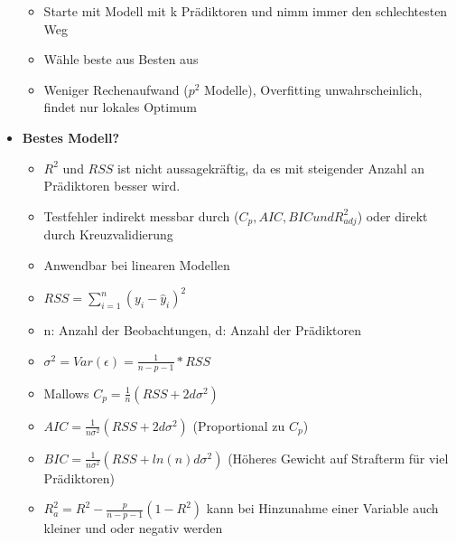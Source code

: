 \documentclass[a4paper]{article}
\begin{document}
\begin{landscape}
\begin{multicols}{3}
\begin{itemize}[noitemsep,nolistsep,leftmargin=*]
\begin{itemize}[noitemsep,nolistsep,leftmargin=*]
                \item Starte mit Modell mit k Prädiktoren und nimm immer den schlechtesten Weg
                \item Wähle beste aus Besten aus
                \item Weniger Rechenaufwand ($p^2$ Modelle), Overfitting unwahrscheinlich, findet nur lokales Optimum
            \end{itemize}
            \item \textbf{Bestes Modell?}
            \begin{itemize}[noitemsep,nolistsep,leftmargin=*]
                \item $R^2$ und $RSS$ ist nicht aussagekräftig, da es mit steigender Anzahl an Prädiktoren besser wird. 
                \item Testfehler indirekt messbar durch ($C_p, AIC, BIC und R^2_{adj}$) oder direkt durch Kreuzvalidierung
                \item Anwendbar bei linearen Modellen
                \item $RSS = \sum_{i=1}^{n}(y_i-\hat{y}_i)^2$
                \item n: Anzahl der Beobachtungen, d: Anzahl der Prädiktoren
                \item $\sigma^2 = Var(\epsilon) = \frac{1}{n-p-1}*RSS$  
                \item Mallows $C_p = \frac{1}{n}(RSS + 2d\sigma^2)$
                \item $AIC = \frac{1}{n\sigma^2}(RSS + 2d\sigma^2)$ (Proportional zu $C_p$)
                \item $BIC = \frac{1}{n\sigma^2}(RSS + ln(n)d\sigma^2)$ (Höheres Gewicht auf Strafterm für viel Prädiktoren)
                \item $R^2_a = R^2 - \frac{p}{n-p-1}(1-R^2)$ kann bei Hinzunahme einer Variable auch kleiner und oder negativ werden
            \end{itemize}
        \end{itemize}




\end{multicols}
\end{landscape}
\end{document}
